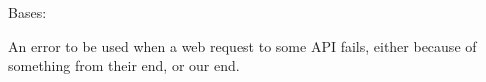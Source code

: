 \documentclass[letterpaper,11pt,english]{sphinxmanual}
\begin{document}

\begin{savenotes}\begin{fulllineitems}
\label{\detokenize{code/opihiexarata.library.error:opihiexarata.library.error.WebRequestError}}
\pysigstartsignatures
{}
\pysigstopsignatures
\sphinxAtStartPar
Bases: {\hyperref[\detokenize{code/opihiexarata.library.error:opihiexarata.library.error.ExarataException}]{}}

\sphinxAtStartPar
An error to be used when a web request to some API fails, either because
of something from their end, or our end.

\end{fulllineitems}\end{savenotes}

\end{document}
